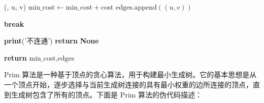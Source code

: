 \documentclass[lang=cn,11pt,a4paper]{elegantpaper}
\begin{document}
\begin{algorithm}[H]
\begin{algorithmic}[1]
                \State {}(, u, v)
                \State $\text{min\_cost} \gets \text{min\_cost} + \text{cost}$
                \State $\text{edges.append}((u, v))$
            \EndIf
            
                \State \textbf{break}
            \EndIf
        \EndFor
        
            \State \textbf{print}('不连通')
            \State \textbf{return} \textbf{None}
        \EndIf
        
        \State \textbf{return} $\text{min\_cost}, \text{edges}$
    \EndFunction
\end{algorithmic}
\end{algorithm}


Prim 算法是一种基于顶点的贪心算法，用于构建最小生成树。它的基本思想是从一个顶点开始，逐步选择与当前生成树连接的具有最小权重的边所连接的顶点，直到生成树包含了所有的顶点。下面是 Prim 算法的伪代码描述：
\end{document}
